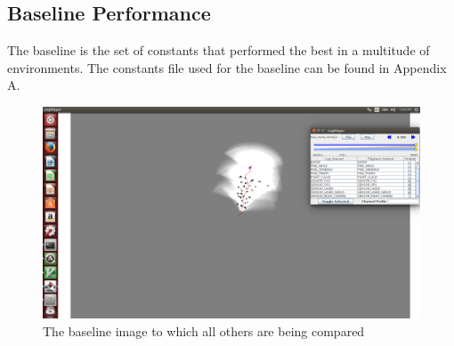 \documentclass[10pt]{IEEEtran}
\begin{document}
\subsection{Baseline Performance}
The baseline is the set of constants that performed the best in a multitude of environments.
The constants file used for the baseline can be found in Appendix A.

\begin{figure}[h]
\includegraphics[trim={25cm 15cm 20cm 7cm}, clip, width=0.9\columnwidth]{Figures/baseline1}
\caption{The baseline image to which all others are being compared}
\label{fig:Baseline}
\end{figure}
\end{document}
